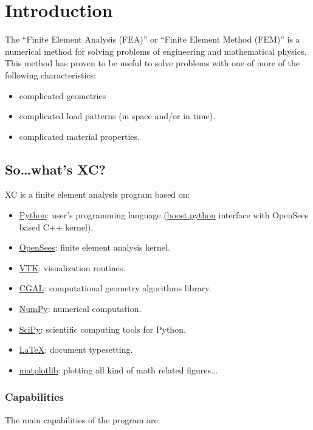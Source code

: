 \chapter{Introduction}

The ``Finite Element Analysis (FEA)'' or ``Finite Element Method (FEM)'' is a numerical method for solving problems of engineering and mathematical physics. This method has proven to be useful to solve problems with one of more of the following characteristics:

\begin{itemize}
\item complicated geometries
\item complicated load patterns (in space and/or in time).
\item complicated material properties.
\end{itemize}

\section{So\ldots what's XC?}
XC is a finite element analysis program based on:

\begin{itemize}
  \item \href{https://www.python.org/}{Python}: user's programming language (\href{https://wiki.python.org/moin/boost.python}{boost.python} interface with OpenSees based C++ kernel).
  \item \href{http://opensees.berkeley.edu}{OpenSees}: finite element analysis kernel.
  \item \href{http://www.vtk.org/}{VTK}: visualization routines.
  \item \href{http://www.cgal.org/}{CGAL}: computational geometry algorithms library.
  \item \href{http://www.numpy.org/}{NumPy}: numerical computation.
  \item \href{https://www.scipy.org/}{SciPy}: scientific computing tools for Python.
  \item \href{https://www.latex-project.org/}{LaTeX}: document typesetting.
  \item \href{http://matplotlib.org/}{matplotlib}: plotting all kind of math related figures...
\end{itemize}

\subsection{Capabilities}
The main capabilities of the program are:

